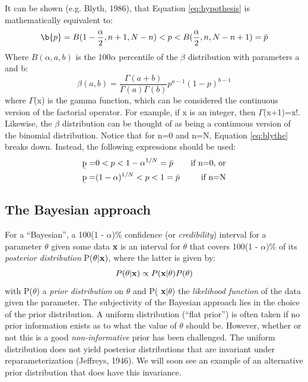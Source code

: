 \documentclass{article}
\begin{document}
It can be shown (e.g. Blyth, 1986), that Equation \ref{eq:hypothesis}
is mathematically equivalent to:
\begin{equation}
  \label{eq:blythe}
  \b{p}  = B(1-\frac{\alpha}{2},n+1,N-n)<p<B(\frac{\alpha}{2},n,N-n+1)
  = \bar{p}
\end{equation}
Where  $B(\alpha,a,b)$ is  the 100$\alpha$  percentile of  the $\beta$
distribution with parameters a and b:
\begin{equation}
  \label{eq:beta}
  \beta(a,b)=\frac{\Gamma(a+b)}{\Gamma(a)\Gamma(b)}p^{a-1}(1-p)^{b-1}
\end{equation}
where $\Gamma$(x) is  the gamma function, which can  be considered the
continuous version of the factorial  operator. For example, if x is an
integer, then $\Gamma$(x+1)=x!. Likewise, the $\beta$ distribution can
be  thought  of  as  being   a  continuous  version  of  the  binomial
distribution. Notice  that for  n=0 and n=N,  Equation \ref{eq:blythe}
breaks down. Instead, the following expressions should be used:
\begin{eqnarray}
  \label{eq:blythespecial}
   \b{p} = &0 < p < 1-\alpha^{1/N} = \bar{p}   &\mbox{ if n=0, or}\\
   \b{p} = &(1-\alpha)^{1/N} < p < 1 = \bar{p} &\mbox{ if n=N}
\end{eqnarray}

\subsection{The Bayesian approach}\label{sec:bayes2D}

For  a  ``Bayesian'',  a  100(1  -  $\alpha$)\%  confidence  (or  {\it
credibility}) interval  for a parameter $\theta$ given  some data {\bf
x} is an interval for $\theta$  that covers 100(1 - $\alpha$)\% of its
{\it posterior  distribution} P($\theta | {\bf x})$,  where the latter
is given by:
\begin{equation}
  \label{eq:4}
  P(\theta | {\bf x}) \propto P({\bf x}|\theta)P(\theta)
\end{equation}
with  P($\theta$) a {\it  prior distribution}  on $\theta$  and P({\bf
x}$|\theta$)  the {\it  likelihood  function} of  the  data given  the
parameter.   The subjectivity  of the  Bayesian approach  lies  in the
choice  of  the prior  distribution.   A  uniform distribution  (``flat
prior'') is often  taken if no prior information exists  as to what the
value of $\theta$  should be.  However, whether or not  this is a good
{\it  non-informative}   prior  has  been   challenged.   The  uniform
distribution does not yield posterior distributions that are invariant
under  reparameterization  (Jeffreys,  1946).   We will  soon  see  an
example  of an  alternative  prior distribution  that  does have  this
invariance.\\
\end{document}
